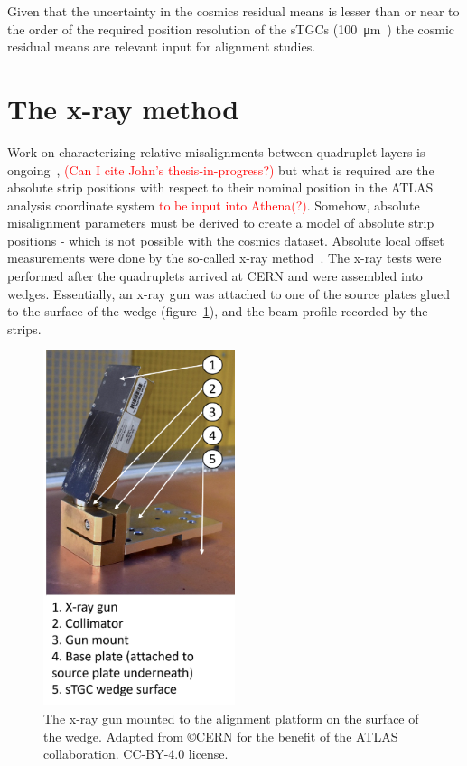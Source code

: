 Given that the uncertainty in the cosmics residual means is lesser than or near to the order of the required position resolution of the sTGCs (\SI{100}{\micro\meter}~\cite{nsw_tdr}) the cosmic residual means are relevant input for alignment studies.

\section{The x-ray method}
\label{x_ray}


Work on characterizing relative misalignments between quadruplet layers is ongoing~\cite{zhao_cosmic_2019}, \textcolor{red}{(Can I cite John's thesis-in-progress?)} but what is required are the absolute strip positions with respect to their nominal position in the ATLAS analysis coordinate system \textcolor{red}{to be input into Athena(?)}. Somehow, absolute misalignment parameters must be derived to create a model of absolute strip positions - which is not possible with the cosmics dataset. Absolute local offset measurements were done by the so-called x-ray method~\cite{lefebvre_precision_2020}. The x-ray tests were performed after the quadruplets arrived at CERN and were assembled into wedges. Essentially, an x-ray gun was attached to one of the source plates glued to the surface of the wedge (figure~\ref{fig:xray_setup}), and the beam profile recorded by the strips.

\begin{figure}
    \centering
    \includegraphics[width = 0.5\textwidth]{figures/figure_xray_setup.pdf}
    \caption{The x-ray gun mounted to the alignment platform on the surface of the wedge. Adapted from \copyright  CERN for the benefit of the ATLAS collaboration. CC-BY-4.0 license.}
    \label{fig:xray_setup}
\end{figure}

